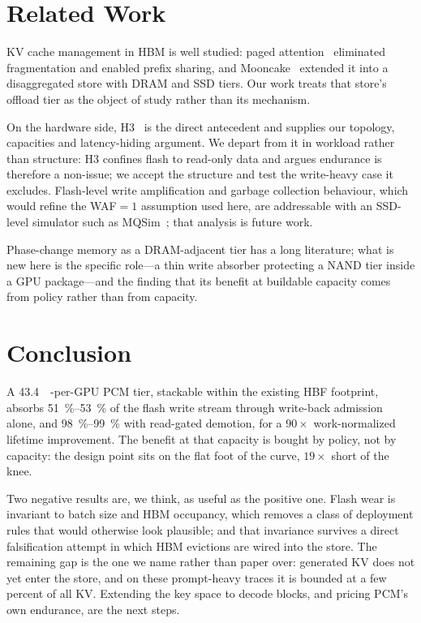 \documentclass[conference]{IEEEtran}
\begin{document}
\section{Related Work}
KV cache management in HBM is well studied: paged attention~\cite{vllm}
eliminated fragmentation and enabled prefix sharing, and
Mooncake~\cite{mooncake} extended it into a disaggregated store with DRAM and
SSD tiers. Our work treats that store's offload tier as the object of study
rather than its mechanism.

On the hardware side, H3~\cite{h3} is the direct antecedent and supplies our
topology, capacities and latency-hiding argument. We depart from it in workload
rather than structure: H3 confines flash to read-only data and argues endurance
is therefore a non-issue; we accept the structure and test the write-heavy case
it excludes. Flash-level write amplification and garbage collection behaviour,
which would refine the WAF${=}1$ assumption used here, are addressable with an
SSD-level simulator such as MQSim~\cite{mqsim}; that analysis is future work.

Phase-change memory as a DRAM-adjacent tier has a long literature; what is new
here is the specific role---a thin write absorber protecting a NAND tier inside a
GPU package---and the finding that its benefit at buildable capacity comes from
policy rather than from capacity.

\section{Conclusion}
A \SI{43.4}{\gibi\byte}-per-GPU PCM tier, stackable within the existing HBF
footprint, absorbs \SIrange{51}{53}{\percent} of the flash write stream through
write-back admission alone, and \SIrange{98}{99}{\percent} with read-gated
demotion, for a $90\times$ work-normalized lifetime improvement. The benefit at
that capacity is bought by policy, not by capacity: the design point sits on the
flat foot of the curve, $19\times$ short of the knee.

Two negative results are, we think, as useful as the positive one. Flash wear is
invariant to batch size and HBM occupancy, which removes a class of deployment
rules that would otherwise look plausible; and that invariance survives a direct
falsification attempt in which HBM evictions are wired into the store. The
remaining gap is the one we name rather than paper over: generated KV does not
yet enter the store, and on these prompt-heavy traces it is bounded at a few
percent of all KV. Extending the key space to decode blocks, and pricing PCM's
own endurance, are the next steps.
\end{document}
